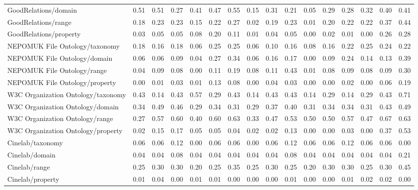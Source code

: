 \begin{tabular}{lccccccccccccccc}
GoodRelations/domain & 0.51 & 0.51 & 0.27 & 0.41 & 0.47 & 0.55 & 0.15 & 0.31 & 0.21 & 0.05 & 0.29 & 0.28 & 0.32 & 0.40 & 0.41 \\
GoodRelations/range & 0.18 & 0.23 & 0.23 & 0.15 & 0.22 & 0.27 & 0.02 & 0.19 & 0.23 & 0.01 & 0.20 & 0.22 & 0.22 & 0.37 & 0.44 \\
GoodRelations/property & 0.03 & 0.05 & 0.05 & 0.08 & 0.20 & 0.11 & 0.01 & 0.04 & 0.05 & 0.00 & 0.02 & 0.01 & 0.00 & 0.26 & 0.28 \\
NEPOMUK File Ontology/taxonomy & 0.18 & 0.16 & 0.18 & 0.06 & 0.25 & 0.25 & 0.06 & 0.10 & 0.16 & 0.08 & 0.16 & 0.22 & 0.25 & 0.24 & 0.22 \\
NEPOMUK File Ontology/domain & 0.06 & 0.06 & 0.09 & 0.04 & 0.27 & 0.34 & 0.06 & 0.16 & 0.17 & 0.00 & 0.09 & 0.24 & 0.14 & 0.13 & 0.39 \\
NEPOMUK File Ontology/range & 0.04 & 0.09 & 0.08 & 0.00 & 0.11 & 0.19 & 0.08 & 0.11 & 0.43 & 0.01 & 0.08 & 0.09 & 0.08 & 0.09 & 0.30 \\
NEPOMUK File Ontology/property & 0.00 & 0.01 & 0.03 & 0.01 & 0.13 & 0.08 & 0.00 & 0.04 & 0.03 & 0.00 & 0.00 & 0.02 & 0.00 & 0.06 & 0.19 \\
W3C Organization Ontology/taxonomy & 0.43 & 0.14 & 0.43 & 0.57 & 0.29 & 0.43 & 0.14 & 0.43 & 0.43 & 0.14 & 0.29 & 0.14 & 0.29 & 0.43 & 0.71 \\
W3C Organization Ontology/domain & 0.34 & 0.49 & 0.46 & 0.29 & 0.34 & 0.31 & 0.29 & 0.37 & 0.40 & 0.31 & 0.34 & 0.34 & 0.31 & 0.43 & 0.49 \\
W3C Organization Ontology/range & 0.27 & 0.57 & 0.60 & 0.40 & 0.60 & 0.63 & 0.33 & 0.47 & 0.53 & 0.50 & 0.50 & 0.57 & 0.47 & 0.67 & 0.63 \\
W3C Organization Ontology/property & 0.02 & 0.15 & 0.17 & 0.05 & 0.05 & 0.04 & 0.02 & 0.02 & 0.13 & 0.00 & 0.00 & 0.03 & 0.00 & 0.37 & 0.53 \\
Cinelab/taxonomy & 0.06 & 0.06 & 0.12 & 0.00 & 0.06 & 0.06 & 0.00 & 0.06 & 0.12 & 0.06 & 0.06 & 0.12 & 0.06 & 0.06 & 0.00 \\
Cinelab/domain & 0.04 & 0.04 & 0.08 & 0.04 & 0.04 & 0.04 & 0.04 & 0.04 & 0.08 & 0.04 & 0.04 & 0.04 & 0.04 & 0.04 & 0.21 \\
Cinelab/range & 0.25 & 0.30 & 0.30 & 0.20 & 0.25 & 0.35 & 0.25 & 0.30 & 0.25 & 0.20 & 0.30 & 0.30 & 0.25 & 0.30 & 0.45 \\
Cinelab/property & 0.01 & 0.04 & 0.00 & 0.01 & 0.01 & 0.00 & 0.00 & 0.00 & 0.01 & 0.00 & 0.00 & 0.01 & 0.02 & 0.02 & 0.00 \\

\end{tabular}
